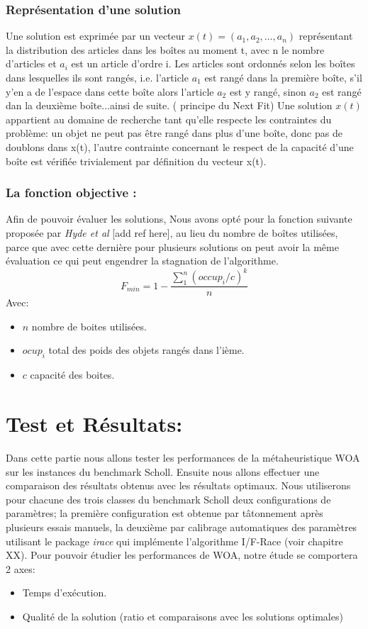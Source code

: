 \documentclass[12pt]{article}
\begin{document}
\subsubsection{Représentation d’une solution }
Une solution est exprimée par un vecteur $ x(t)=(a_1, a_2, …, a_n)$ représentant la distribution des articles dans les boîtes au moment t, avec n le nombre d’articles et $a_i$ est un article d’ordre i. Les articles sont ordonnés selon les boîtes dans lesquelles ils sont rangés, i.e. l’article $a_1$ est rangé dans la première boîte, s’il y’en a de l’espace dans cette boîte alors l’article $a_2$ est y rangé, sinon $a_2$ est rangé dan la deuxième boîte...ainsi de suite. ( principe du Next Fit) 
Une solution \(x(t)\) appartient au domaine de recherche tant qu’elle respecte les contraintes du problème: un objet ne peut pas être rangé dans plus d’une boîte, donc pas de doublons dans x(t), l’autre contrainte concernant le respect de la capacité d’une boîte est vérifiée trivialement par définition du vecteur x(t).

\subsubsection{La fonction objective :}
Afin de pouvoir évaluer les solutions, Nous avons opté pour la fonction suivante proposée par \emph{Hyde et al} [add ref here], au lieu du nombre de boîtes utilisées, parce que avec cette dernière pour plusieurs solutions on peut avoir la même évaluation ce qui peut engendrer la stagnation de l’algorithme.
\[ F_{min} = 1 - \frac{\sum_{1}^{n} (occup_i / c)^k}{n}\]
Avec:
\begin{itemize}
    \item \(n\) nombre de boites utilisées.
    \item \(ocup_i\) total des poids des objets rangés dans l’ième.
    \item \(c\) capacité des boites.
    
\end{itemize}
\section{Test et Résultats: }
Dans cette partie nous allons tester les performances de la métaheuristique WOA sur les instances du benchmark Scholl. Ensuite nous allons effectuer une comparaison des résultats obtenus avec les résultats optimaux. Nous utiliserons pour chacune des trois classes du benchmark Scholl deux configurations de paramètres; la première configuration est obtenue par tâtonnement après plusieurs essais manuels, la deuxième par calibrage automatiques des paramètres utilisant le package \emph{irace} qui implémente l’algorithme I/F-Race (voir chapitre XX).
Pour pouvoir étudier les performances de WOA, notre étude se comportera 2 axes:
\begin{itemize}
    \item Temps d'exécution.
    \item Qualité de la solution  (ratio et comparaisons avec les solutions optimales)
\end{itemize}
\end{document}

